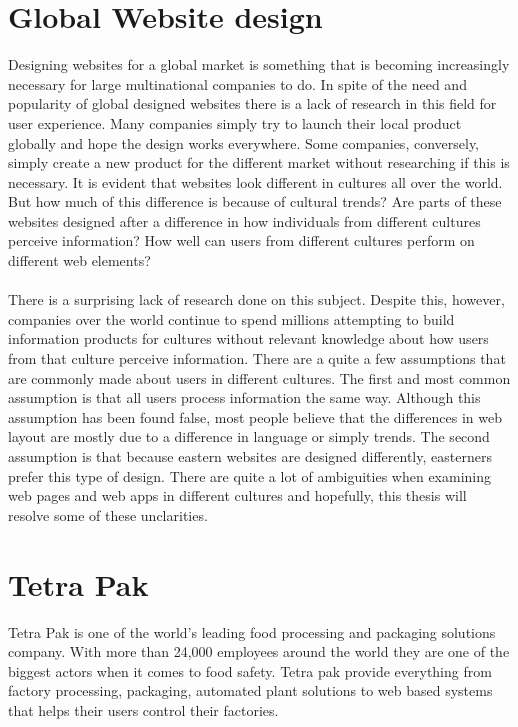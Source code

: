 \section{Global Website design}
Designing websites for a global market is something that is becoming increasingly necessary for large multinational companies to do. In spite of the need and popularity of global designed websites there is a lack of research in this field for user experience. Many companies simply try to launch their local product globally and hope the design works everywhere. Some companies, conversely, simply create a new product for the different market without researching if this is necessary. It is evident that websites look different in cultures all over the world. But how much of this difference is because of cultural trends? Are parts of these websites designed after a difference in how individuals from different cultures perceive information? How well can users from different cultures perform on different web elements?
\\\\
There is a surprising lack of research done on this subject. Despite this, however, companies over the world continue to spend millions attempting to build information products for cultures without relevant knowledge about how users from that culture perceive information. There are a quite a few assumptions that are commonly made about users in different cultures. The first and most common assumption is that all users process information the same way. Although this assumption has been found false, most people believe that the differences in web layout are mostly due to a difference in language or simply trends. The second assumption is that because eastern websites are designed differently, easterners prefer this type of design. There are quite a lot of ambiguities when examining web pages and web apps in different cultures and hopefully, this thesis will resolve some of these unclarities.

\section{Tetra Pak}
Tetra Pak is one of the world's leading food processing and packaging solutions company.  With more than 24,000 employees around the world they are one of the biggest actors when it comes to food safety. Tetra pak provide everything from factory processing, packaging, automated plant solutions to web based systems that helps their users control their factories.

